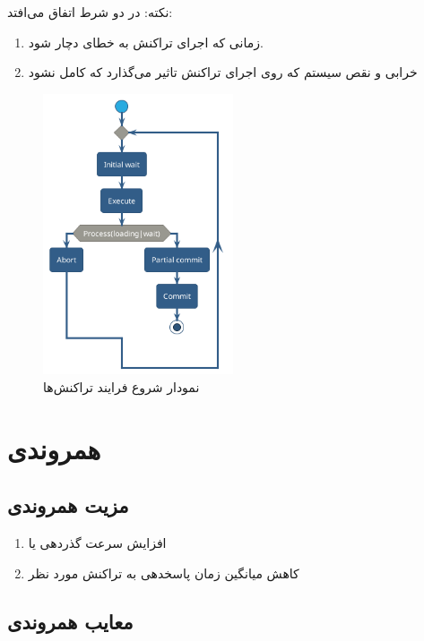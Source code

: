 \documentclass[a4paper]{article}
\begin{document}
نکته:  در دو شرط اتفاق می‌افتد:

\begin{enumerate}
    \item زمانی که اجرای تراکنش به خطای  دچار شود.
    \item خرابی و نقص سیستم که روی اجرای تراکنش تاثیر می‌گذارد که کامل نشود
\end{enumerate}

\begin{figure}
    \centering
    \includegraphics[width=0.5\textwidth]{umls/transactionStatus.png}
    \caption{نمودار شروع فرایند تراکنش‌ها}
    \label{fig: uml}
\end{figure}

\newpage

\section{همروندی}

\subsection{مزیت همروندی}

\begin{enumerate}
    \item افزایش سرعت گذردهی یا 
    \item کاهش میانگین زمان پاسخدهی به تراکنش مورد نظر
\end{enumerate}

\subsection{معایب همروندی} 
\end{document}

